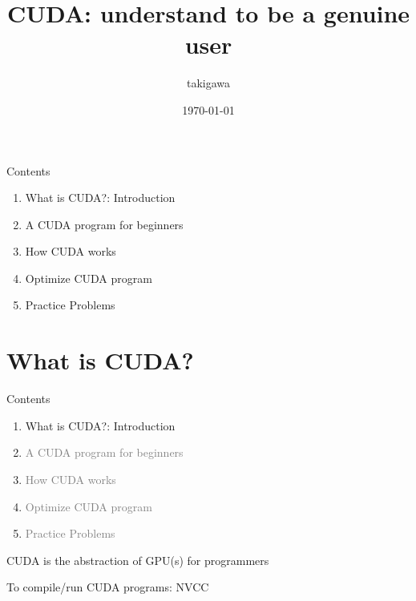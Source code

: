 \documentclass[dvipdfmx,11pt]{beamer}   %
\title{CUDA: understand to be a genuine user}
\author{takigawa}
\date{\today}
\begin{document}
\begin{frame}
  \titlepage       
\end{frame}
\begin{frame}{Contents}
  \begin{enumerate}[<+->]   %
    \item What is CUDA?: Introduction
    \item A CUDA program for beginners
    \item How CUDA works
    \item Optimize CUDA program
    \item Practice Problems
  \end{enumerate}
\end{frame}
\section{What is CUDA?}
\begin{frame}{Contents}
  \begin{enumerate}[<+->]   %
    \item What is CUDA?: Introduction
    \item \textcolor{gray}{A CUDA program for beginners}
    \item \textcolor{gray}{How CUDA works}
    \item \textcolor{gray}{Optimize CUDA program}
    \item \textcolor{gray}{Practice Problems}
  \end{enumerate}
\end{frame}
\begin{frame}{CUDA is the abstraction of GPU(s) for programmers}
  
\end{frame}
\begin{frame}{To compile/run CUDA programs: NVCC}

\end{frame}
\end{document}
